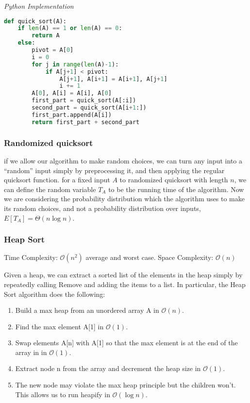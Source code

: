 \documentclass{article}
\newcommand{\bigO}{\ensuremath{\mathcal{O}}}
\begin{document}
\vspace{8pt} \emph{Python Implementation}
\begin{lstlisting}[language=Python]
def quick_sort(A):
    if len(A) == 1 or len(A) == 0:
        return A
    else:
        pivot = A[0]
        i = 0
        for j in range(len(A)-1):
            if A[j+1] < pivot:
                A[j+1], A[i+1] = A[i+1], A[j+1]
                i += 1
        A[0], A[i] = A[i], A[0]
        first_part = quick_sort(A[:i])
        second_part = quick_sort(A[i+1:])
        first_part.append(A[i])
        return first_part + second_part
\end{lstlisting}
    
    \subsubsection{Randomized quicksort}
    if we allow our algorithm to make random choices, we can turn any input into a “random” input simply by preprocessing it, and then applying the regular quicksort function. for a fixed input $A$ to randomized quicksort with length $n$, we can define the random variable $T_A$ to be the running time of the algorithm. Now we are considering the probability distribution which the algorithm uses to make its random choices, and not a probability distribution over inputs, $E[T_A] = \Theta(n \log{n})$.
    
    \subsubsection{Heap Sort}
    Time Complexity: $\bigO(n^2)$ average and worst case. Space Complexity: $\bigO (n)$
    
    Given a heap, we can extract a sorted list of the elements in the heap simply by repeatedly calling Remove and adding the items to a list. In particular, the Heap Sort algorithm does the following: 
    \begin{enumerate}
        \item Build a max heap from an unordered array A in $\bigO(n)$.
        \item Find the max element A[1] in $\bigO(1)$.
        \item Swap elements A[n] with A[1] so that the max element is at the end of the array in in $\bigO(1)$.
        \item Extract node n from the array and decrement the heap size  in $\bigO(1)$.
        \item The new node may violate the max heap principle but the children won't. This allows us to run heapify in $\bigO(\log n)$.
    \end{enumerate}
    
\end{document}
